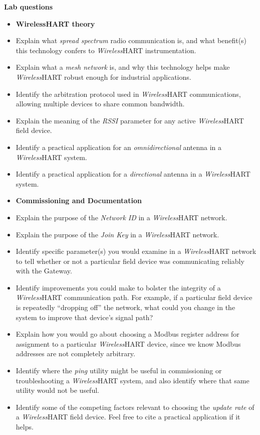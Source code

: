 \vfil \eject

\noindent
{\bf Lab questions}

\vskip 5pt

\begin{itemize}
\item{} {\bf WirelessHART theory}
\item{} Explain what {\it spread spectrum} radio communication is, and what benefit(s) this technology confers to {\sl Wireless}HART instrumentation.
\item{} Explain what a {\it mesh network} is, and why this technology helps make {\sl Wireless}HART robust enough for industrial applications.
\item{} Identify the arbitration protocol used in {\sl Wireless}HART communications, allowing multiple devices to share common bandwidth.
\item{} Explain the meaning of the {\it RSSI} parameter for any active {\sl Wireless}HART field device.
\item{} Identify a practical application for an {\it omnidirectional} antenna in a {\sl Wireless}HART system.
\item{} Identify a practical application for a {\it directional} antenna in a {\sl Wireless}HART system.
\end{itemize}

\filbreak

\begin{itemize}
\item{} {\bf Commissioning and Documentation}
\item{} Explain the purpose of the {\it Network ID} in a {\sl Wireless}HART network.
\item{} Explain the purpose of the {\it Join Key} in a {\sl Wireless}HART network.
\item{} Identify specific parameter(s) you would examine in a {\sl Wireless}HART network to tell whether or not a particular field device was communicating reliably with the Gateway.
\item{} Identify improvements you could make to bolster the integrity of a {\sl Wireless}HART communication path.  For example, if a particular field device is repeatedly ``dropping off'' the network, what could you change in the system to improve that device's signal path?
\item{} Explain how you would go about choosing a Modbus register address for assignment to a particular {\sl Wireless}HART device, since we know Modbus addresses are not completely arbitrary.
\item{} Identify where the {\it ping} utility might be useful in commissioning or troubleshooting a {\sl Wireless}HART system, and also identify where that same utility would not be useful.
\item{} Identify some of the competing factors relevant to choosing the {\it update rate} of a {\sl Wireless}HART field device.  Feel free to cite a practical application if it helps.
\end{itemize}

